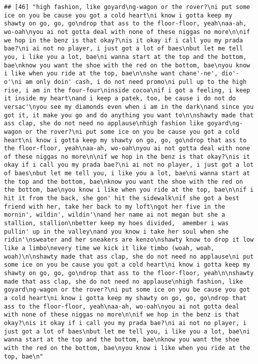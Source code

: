 \documentclass[]{article}
\begin{document}
\begin{verbatim}
## [46] "high fashion, like goyard\ng-wagon or the rover?\ni put some ice on you be cause you got a cold heart\ni know i gotta keep my shawty on go, go, go\ndrop that ass to the floor-floor, yeah\naa-ah, wo-oah\nyou ai not gotta deal with none of these niggas no more\n\nif we hop in the benz is that okay?\nis it okay if i call you my prada bae?\ni ai not no player, i just got a lot of baes\nbut let me tell you, i like you a lot, bae\ni wanna start at the top and the bottom, bae\nknow you want the shoe with the red on the bottom, bae\nyou know i like when you ride at the top, bae\n\nshe want chane'-ne', dio'-o'\ni am only doin' cash, i do not need promo\ni pull up to the high rise, i am in the four-four\ninside cocoa\nif i got a feeling, i keep it inside my heart\nand i keep a patek, too, be cause i do not do versac'\nyou see my diamonds even when i am in the dark\nand since you got it, it make you go and do anything you want to\n\nshawty made that ass clap, she do not need no applause\nhigh fashion like goyard\ng-wagon or the rover?\ni put some ice on you be cause you got a cold heart\ni know i gotta keep my shawty on go, go, go\ndrop that ass to the floor-floor, yeah\naa-ah, wo-oah\nyou ai not gotta deal with none of these niggas no more\n\nif we hop in the benz is that okay?\nis it okay if i call you my prada bae?\ni ai not no player, i just got a lot of baes\nbut let me tell you, i like you a lot, bae\ni wanna start at the top and the bottom, bae\nknow you want the shoe with the red on the bottom, bae\nyou know i like when you ride at the top, bae\n\nif i hit it from the back, she gon' hit the sidewalk\nif she got a best friend with her, take her back to my loft\ngot her five in the mornin', wildin', wildin'\nand her name ai not megan but she a stallion, stallion\nbetter keep my hoes divided,  amember i was pullin' up in the valley\nand you know i take her soul when she ridin'\nsweater and her sneakers are kenzo\nshawty know to drop it low like a limbo\nevery time we kick it like timbo (woah, woah, woah)\n\nshawty made that ass clap, she do not need no applause\ni put some ice on you be cause you got a cold heart\ni know i gotta keep my shawty on go, go, go\ndrop that ass to the floor-floor, yeah\n\nshawty made that ass clap, she do not need no applause\nhigh fashion, like goyard\ng-wagon or the rover?\ni put some ice on you be cause you got a cold heart\ni know i gotta keep my shawty on go, go, go\ndrop that ass to the floor-floor, yeah\naa-ah, wo-oah\nyou ai not gotta deal with none of these niggas no more\n\nif we hop in the benz is that okay?\nis it okay if i call you my prada bae?\ni ai not no player, i just got a lot of baes\nbut let me tell you, i like you a lot, bae\ni wanna start at the top and the bottom, bae\nknow you want the shoe with the red on the bottom, bae\nyou know i like when you ride at the top, bae\n"                                                                                                                                                                                                                                                                                                                                                                                                                                                          
\end{verbatim}
\end{document}
